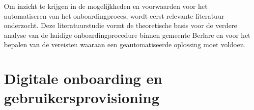 




Om inzicht te krijgen in de mogelijkheden en voorwaarden voor het automatiseren van het onboardingproces, wordt eerst relevante literatuur onderzocht. Deze literatuurstudie vormt de theoretische basis voor de verdere analyse van de huidige onboardingprocedure binnen gemeente Berlare en voor het bepalen van de vereisten waaraan een geautomatiseerde oplossing moet voldoen.

\section{Digitale onboarding en gebruikersprovisioning}

